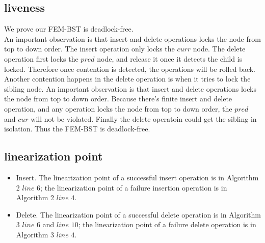 \documentclass{article}
\begin{document}
\subsection{liveness}
We prove our FEM-BST is deadlock-free.\\
An important observation is that insert and delete operations locks the node from top to down order. The insert operation only locks the $curr$ node. The delete operation first locks the $pred$ node, and release it once it detects the child is locked. Therefore once contention is detected, the operations will be rolled back.\\
Another contention happens in the delete operation is when it tries to lock the sibling node.  An important observation is that insert and delete operations locks the node from top to down order. Because there's finite insert and delete operation, and any operation locks the node from top to down order, the $pred$ and $cur$ will not be violated. Finally the delete operatoin could get the sibling in isolation. Thus the FEM-BST is deadlock-free.
\subsection{linearization point}
\begin{itemize}
\item Insert. The linearization point of a successful insert operation is in Algorithm 2 $line$ $6$; the linearization point of a failure insertion operation is in Algorithm 2 $line$ $4$.
\item Delete. The linearization point of a successful delete operation is in Algorithm 3 $line$ $6$ and $line$ $10$; the linearization point of a failure delete operation is in Algorithm 3 $line$ $4$.
\end{itemize}
\end{document}
